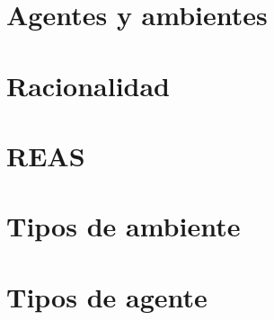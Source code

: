 
\section{Agentes y ambientes}%

\section{Racionalidad}%

\section{REAS}%

\section{Tipos de ambiente}%

\section{Tipos de agente} %

